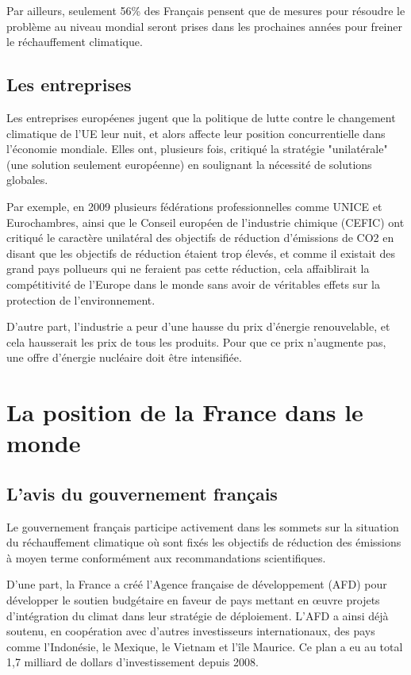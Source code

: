 \documentclass[a4paper,10pt]{article}
\begin{document}
Par ailleurs, seulement 56\% des Français pensent que de mesures pour résoudre le
problème au niveau mondial seront prises dans  les prochaines années  pour freiner le réchauffement  climatique.

\subsection{Les entreprises}

Les entreprises {\color{red}européenes} jugent que la politique  de  lutte  contre  le
changement climatique de l'UE {\color{red}leur} nuit, et alors affect{\color{red}e leur} position concurrentielle dans l'économie mondiale. {\color{red}Elles} ont, plusieurs fois, critiqué la stratégie "unilatérale" (une
solution seulement européenne) en soulignant la nécessité de solutions globales.

Par  exemple, en  2009  plusieurs fédérations  professionnelles  comme UNICE  et
Eurochambres, ainsi que le Conseil  européen de l'industrie chimique (CEFIC) ont
critiqué le caractère  unilatéral des objectifs de réduction  d'émissions de CO2
en  disant que  les  objectifs de  réduction  {\color{red}étaient} trop  élevés,  et comme  il
existait des grand  pays pollueurs qui ne feraient pas  cette réduction, cela
affaiblirait la compétitivité de l'Europe dans le monde sans avoir de véritables effets sur la
protection de l'environnement.

D'autre part, l'industrie a peur d'une hausse du prix d'énergie renouvelable, et
cela hausserait  les prix de  tous les produits.  Pour que ce  prix n'augmente
pas, une offre d'énergie nucléaire doit être intensifiée.

\section{La position de la France dans le monde}

\subsection{L’avis du gouvernement  {\color{red}f}rançais}

Le gouvernement français participe activement dans les sommets sur la situation du réchauffement climatique où sont fixés les objectifs de réduction des émissions à moyen terme conformément aux recommandations scientifiques. 

D'une part, la France a créé l’Agence française de développement (AFD) pour développer le soutien budgétaire en faveur de pays mettant en œuvre projets d’intégration du climat dans leur stratégie de déploiement. L’AFD a ainsi déjà soutenu, en coopération avec d’autres investisseurs internationaux, des pays comme l’Indonésie, le Mexique, le Vietnam et l’île Maurice. Ce plan a eu au total 1,7 milliard de dollars d’investissement depuis 2008.
\end{document}
